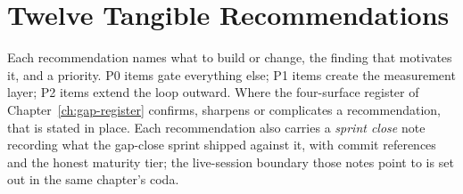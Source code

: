 \section{Twelve Tangible Recommendations}

Each recommendation names what to build or change, the finding that motivates it, and a priority. P0 items gate everything else; P1 items create the measurement layer; P2 items extend the loop outward. Where the four-surface register of Chapter~\ref{ch:gap-register} confirms, sharpens or complicates a recommendation, that is stated in place. Each recommendation also carries a \emph{sprint close} note recording what the gap-close sprint shipped against it, with commit references and the honest maturity tier; the live-session boundary those notes point to is set out in the same chapter's coda.

